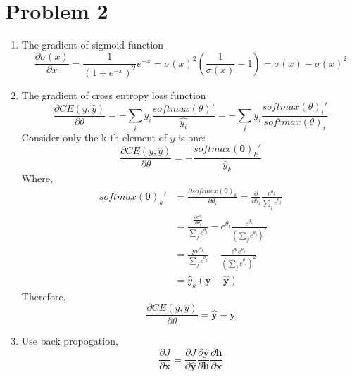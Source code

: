 \documentclass[10pt]{article}
\begin{document}
\section*{Problem 2}
\begin{enumerate}[label=(\alph*)]
\item
The gradient of sigmoid function
\begin{equation*}
	\frac{\partial\sigma(x)}{\partial x} = \frac{1}{(1+e^{-x})^2}e^{-x} = \sigma(x)^2(\frac{1}{\sigma(x)}-1) = \sigma(x) - \sigma(x)^2
\end{equation*}
\item
The gradient of cross entropy loss function
\begin{equation*}
	\frac{\partial CE(y,\hat{y})}{\partial\theta} = -\sum_{i}y_{i}\frac{softmax(\theta)'}{\hat{y_{i}}} = -\sum_{i}y_{i}\frac{softmax(\theta)_i'}{softmax(\theta)_i}
\end{equation*}
Consider only the k-th element of $y$ is one:
\begin{equation*}
	\frac{\partial CE(y,\hat{y})}{\partial\theta} = - \frac{softmax(\mathbf{\theta})_k'}{\hat{y}_k}
\end{equation*}
Where,
\begin{equation*}
	\begin{aligned}
	softmax(\mathbf{\theta})_k' & = \frac{\partial softmax(\mathbf{\theta})_k}{\partial\theta_i} = \frac{\partial}{\partial\theta_i}\frac{e^{\theta_{k}}}{\sum_{j}e^{\theta_j}}\\
					 & = \frac{\frac{\partial e^{\theta_k}}{\partial \theta_i}}{\sum_{j}e^{\theta_j}} - e^{\theta_i}\frac{e^{\theta_k}}{(\sum_{j}e^{\theta_j})^2}\\
					 & = \frac{\mathbf{y}e^{\theta_k}}{\sum_{j}e^{\theta_j}} - \frac{e^{\mathbf{\theta}}e^{\theta_k}}{(\sum_{j}e^{\theta_j})^2}\\
					 & = \hat{y}_k(\mathbf{y}-\mathbf{\hat{y}})
	\end{aligned}
\end{equation*}
Therefore,
\begin{equation*}
	\frac{\partial CE(y,\hat{y})}{\partial\theta} = \mathbf{\hat{y}} - \mathbf{y}
\end{equation*}
\item
Use back propogation,
\begin{equation*}
	\frac{\partial J}{\partial \mathbf{x}} = \frac{\partial J}{\partial \mathbf{\hat{y}}}\frac{\partial \mathbf{\hat{y}}}{\partial \mathbf{h}}\frac{{\partial \mathbf{h}}}{\partial \mathbf{x}}
\end{equation*}

\end{enumerate}
\end{document}
